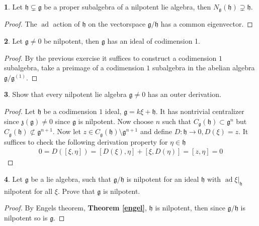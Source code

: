 \documentclass[10.5pt]{article}
\theoremstyle{definition}
\newtheorem{pb}{}
\numberwithin{example}{subsection}
\numberwithin{proposition}{subsection}
\numberwithin{pb}{subsection}
\begin{document}
        \begin{pb}
            Let \(\mathfrak{h} \subsetneq \mathfrak{g}\) be a proper subalgebra of a nilpotent lie algebra, then \(N_{\mathfrak{g}}(\mathfrak{h}) \supsetneq \mathfrak{h}\).

            \begin{proof}
                The \(\operatorname{ad}\) action of \(\mathfrak{h}\) on the vectorspace \(\mathfrak{g}/\mathfrak{h}\) has a common eigenvector.
            \end{proof}
        \end{pb}

        \begin{pb}
            Let \(\mathfrak{g} \neq 0\) be nilpotent, then \(\mathfrak{g}\) has an ideal of codimension 1.

            \begin{proof}
                By the previous exercise it suffices to construct a codimension \(1\) subalgebra, take a preimage of a codimension \(1\) subalgebra in the abelian algebra \(\mathfrak{g}/\mathfrak{g}^{(1)}\).
            \end{proof}
        \end{pb}

        \begin{pb}
            Show that every nilpotent lie algebra \(\mathfrak{g} \neq 0\) has an outer derivation.

            \begin{proof}
                Let \(\mathfrak{h}\) be a codimension \(1\) ideal, \(\mathfrak{g} = k\xi + \mathfrak{h}\). It has nontrivial centralizer since \(\mathfrak{z}(\mathfrak{g}) \neq 0\) since \(\mathfrak{g}\) is nilpotent. Now choose \(n\) such that \(C_\mathfrak{g}(\mathfrak{h}) \subset \mathfrak{g}^n\) but \(C_\mathfrak{g}(\mathfrak{h}) \not \subset \mathfrak{g}^{n+1}\). Now let \(z \in C_{\mathfrak{g}}(\mathfrak{h}) \setminus \mathfrak{g}^{n+1}\) and define \(D: \mathfrak{h} \to 0, D(\xi) = z\). It suffices to check the following derivation property for \(\eta \in \mathfrak{h}\)
                \begin{align}
                    0 = D([\xi,\eta]) = [D(\xi),\eta] + [\xi,D(\eta)] = [z,\eta] = 0
                \end{align}
            \end{proof}
        \end{pb}

        \begin{pb}
            Let \(\mathfrak{g}\) be a lie algebra, such that \(\mathfrak{g}/\mathfrak{h}\) is nilpotent for an ideal \(\mathfrak{h}\) with \(\operatorname{ad} \xi\vert_\mathfrak{h}\) nilpotent for all \(\xi\). Prove that \(\mathfrak{g}\) is nilpotent.

            \begin{proof}
                By Engels theorem, \textbf{Theorem \ref{engel}}, \(\mathfrak{h}\) is nilpotent, then since \(\mathfrak{g}/\mathfrak{h}\) is nilpotent so is \(\mathfrak{g}\).
            \end{proof}
        \end{pb}
\end{document}

